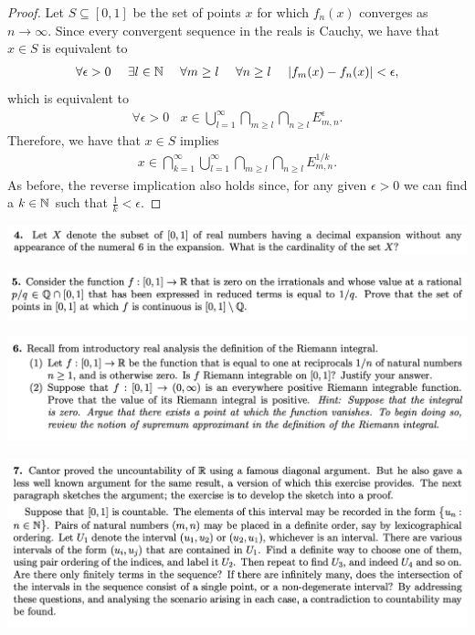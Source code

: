 \begin{proof}
  Let $S \subseteq [0, 1]$ be the set of points $x$ for which $f_n(x)$ converges as $n \to \infty$. Since every
  convergent sequence in the reals is Cauchy, we have that $x \in S$ is equivalent to
  \begin{align*}
    \forall \epsilon > 0 ~~~~ \exists l \in \mathbb{N} ~~~~ \forall m \geq l ~~~~ \forall n \geq l ~~~~ |f_m(x) - f_n(x)| < \epsilon,
  \end{align*}
  which is equivalent to
  \begin{align*}
    \forall \epsilon > 0 ~~~~ x \in \bigcup_{l=1}^\infty \bigcap_{m \geq l} \bigcap_{n \geq l} E_{m,n}^\epsilon.
  \end{align*}
  Therefore, we have that $x \in S$ implies
  \begin{align*}
    x \in \bigcap_{k=1}^\infty \bigcup_{l=1}^\infty \bigcap_{m \geq l} \bigcap_{n \geq l} E_{m,n}^{1/k}.
  \end{align*}
  As before, the reverse implication also holds since, for any given $\epsilon > 0$ we can find a $k \in \mathbb{N}$
  such that $\frac{1}{k} < \epsilon$.
\end{proof}



\includegraphics[width=400pt]{img/analysis--berkeley-202a--homework-1-f175.png}

\includegraphics[width=400pt]{img/analysis--berkeley-202a--homework-1-5192.png}

\includegraphics[width=400pt]{img/analysis--berkeley-202a--homework-1-f5e8.png}


\includegraphics[width=400pt]{img/analysis--berkeley-202a--homework-1-a577.png}
